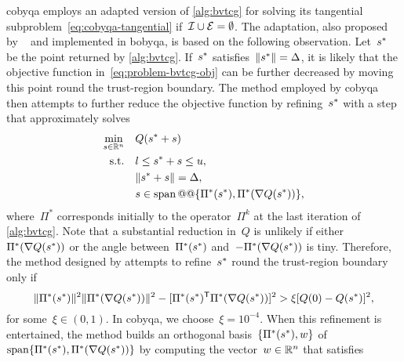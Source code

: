\Gls{cobyqa} employs an adapted version of \cref{alg:bvtcg} for solving its tangential subproblem~\cref{eq:cobyqa-tangential} if~$\mathcal{I} \cup \mathcal{E} = \emptyset$.
The adaptation, also proposed by \citeauthor{Powell_2009}~\cite[\S~3]{Powell_2009} and implemented in \gls{bobyqa}, is based on the following observation.
Let~$\sstep[\ast]$ be the point returned by \cref{alg:bvtcg}.
If~$\sstep[\ast]$ satisfies~$\norm{\sstep[\ast]} = \rad$, it is likely that the objective function in~\cref{eq:problem-bvtcg-obj} can be further decreased by moving this point round the trust-region boundary.
The method employed by \gls{cobyqa} then attempts to further reduce the objective function by refining~$\sstep[\ast]$ with a step that approximately solves
\begin{subequations}
    \label{eq:cobyqa-tangential-bounds-alternative}
    \begin{align}
        \min_{\sstep \in \R^n}  & \quad Q(\sstep[\ast] + \sstep)\\
        \text{s.t.}             & \quad \xl \le \sstep[\ast] + \sstep \le \xu,\\
                                & \quad \norm{\sstep[\ast] + \sstep} = \rad,\\
                                & \quad \sstep \in \vspan @@ \set{\Pi^{\ast}(\sstep[\ast]), \Pi^{\ast}(\nabla Q(\sstep[\ast]))},
    \end{align}
\end{subequations}
where~$\Pi^{\ast}$ corresponds initially to the operator~$\Pi^k$ at the last iteration of \cref{alg:bvtcg}.
Note that a substantial reduction in~$Q$ is unlikely if either~$\Pi^{\ast}(\nabla Q(\sstep[\ast]))$ or the angle between~$\Pi^{\ast}(\sstep[\ast])$ and~$-\Pi^{\ast}(\nabla Q(\sstep[\ast]))$ is tiny.
Therefore, the method designed by \citeauthor{Powell_2009} attempts to refine~$\sstep[\ast]$ round the trust-region boundary only if
\begin{equation*}
    \norm{\Pi^{\ast}(\sstep[\ast])}^2 \norm{\Pi^{\ast}(\nabla Q(\sstep[\ast]))}^2 - [\Pi^{\ast}(\sstep[\ast])^{\T} \Pi^{\ast}(\nabla Q(\sstep[\ast]))]^2 > \xi [Q(0) - Q(\sstep[\ast])]^2,
\end{equation*}
for some~$\xi \in (0, 1)$.
In \gls{cobyqa}, we choose~$\xi = 10^{-4}$.
When this refinement is entertained, the method builds an orthogonal basis~$\set{\Pi^{\ast}(\sstep[\ast]), w}$ of~$\vspan \set{\Pi^{\ast}(\sstep[\ast]), \Pi^{\ast}(\nabla Q(\sstep[\ast]))}$ by computing the vector~$w \in \mathbb{R}^n$ that satisfies
